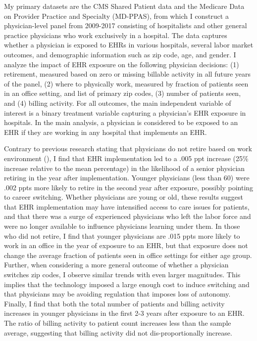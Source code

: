 \documentclass[11pt]{article}
\begin{document}
My primary datasets are the CMS Shared Patient data and the Medicare Data on Provider Practice and Specialty (MD-PPAS), from which I construct a physician-level panel from 2009-2017 consisting of hospitalists and other general practice physicians who work exclusively in a hospital. The data captures whether a physician is exposed to EHRs in various hospitals, several labor market outcomes, and demographic information such as zip code, age, and gender. I analyze the impact of EHR exposure on the following physician decisions: (1) retirement, measured based on zero or missing billable activity in all future years of the panel, (2) where to physically work, measured by fraction of patients seen in an office setting, and list of primary zip codes, (3) number of patients seen, and (4) billing activity. For all outcomes, the main independent variable of interest is a binary treatment variable capturing a physician's EHR exposure in hospitals. In the main analysis, a physician is considered to be exposed to an EHR if they are working in any hospital that implements an EHR.

Contrary to previous research stating that physicians do not retire based on work environment (\cite{Bahrami2002}), I find that EHR implementation led to a .005 ppt increase (25\% increase relative to the mean percentage) in the likelihood of a senior physician retiring in the year after implementation. Younger physicians (less than 60) were .002 ppts more likely to retire in the second year after exposure, possibly pointing to career switching. Whether physicians are young or old, these results suggest that EHR implementation may have intensified access to care issues for patients, and that there was a surge of experienced physicians who left the labor force and were no longer available to influence physicians learning under them. In those who did not retire, I find that younger physicians are .015 ppts more likely to work in an office in the year of exposure to an EHR, but that exposure does not change the average fraction of patients seen in office settings for either age group. Further, when considering a more general outcome of whether a physician switches zip codes, I observe similar trends with even larger magnitudes. This implies that the technology imposed a large enough cost to induce switching and that physicians may be avoiding regulation that imposes loss of autonomy. Finally, I find that both the total number of patients and billing activity increases in younger physicians in the first 2-3 years after exposure to an EHR. The ratio of billing activity to patient count increases less than the sample average, suggesting that billing activity did not dis-proportionally increase. 
\end{document}
